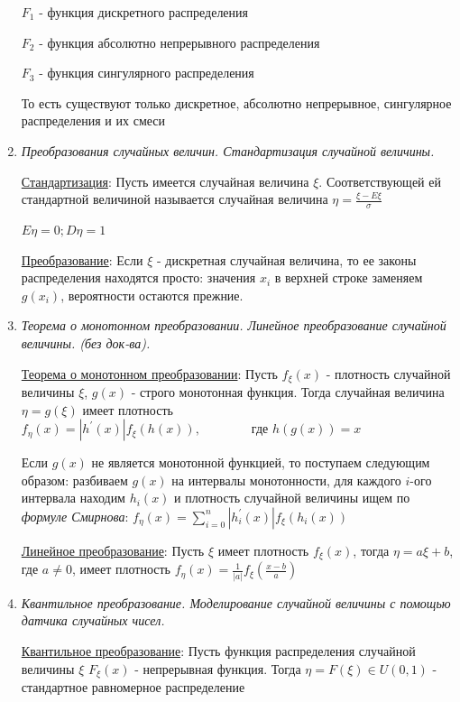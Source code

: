 \documentclass[12pt]{article}
\begin{document}
\begin{enumerate}
    $F_1$ - функция дискретного распределения

    $F_2$ - функция абсолютно непрерывного распределения

    $F_3$ - функция сингулярного распределения

    То есть существуют только дискретное, абсолютно непрерывное, сингулярное распределения и их смеси

    \item \textit{Преобразования случайных величин. Стандартизация случайной величины. }

    \hyperlink{standardizationofrandomvalue}{Стандартизация}: Пусть имеется случайная величина $\xi$. Соответствующей ей стандартной величиной называется
    случайная величина $\eta = \frac{\xi - E\xi}{\sigma}$

    $E\eta = 0; D\eta = 1$

    \hyperlink{randomvaluetransformation}{Преобразование}: Если $\xi$ - дискретная случайная величина, то ее законы распределения находятся просто: значения $x_i$ в верхней строке заменяем $g(x_i)$, вероятности остаются прежние.
    
    \item \textit{Теорема о монотонном преобразовании. Линейное преобразование случайной величины. (без док-ва).}
    
    \hyperlink{monotonoustransformationtheorem}{Теорема о монотонном преобразовании}: \Ths Пусть $f_\xi(x)$ - плотность случайной величины $\xi$, $g(x)$ - строго монотонная функция. Тогда 
    случайная величина $\eta = g(\xi)$ имеет плотность $f_\eta(x) = |h^\prime(x)| f_\xi(h(x)), \qquad\qquad \text{где } h(g(x)) = x$

    Если $g(x)$ не является монотонной функцией, то поступаем следующим образом: разбиваем $g(x)$ на интервалы монотонности, 
    для каждого $i$-ого интервала находим $h_i(x)$ и плотность случайной величины ищем по \textit{формуле Смирнова}: 
    $f_\eta(x) = \sum_{i = 0}^n |h_i^\prime(x)| f_\xi(h_i(x))$
    
    \hyperlink{lineartransformation}{Линейное преобразование}: \Ths Пусть $\xi$ имеет плотность $f_\xi(x)$, тогда $\eta = a\xi + b$, где $a \neq 0$, имеет плотность $f_\eta(x) = \frac{1}{|a|}f_\xi\left(\frac{x - b}{a}\right)$
    
    \item \textit{Квантильное преобразование. Моделирование случайной величины с помощью датчика случайных чисел.}

    \hyperlink{quantiletransformation}{Квантильное преобразование}: Пусть функция распределения случайной величины $\xi$ $F_\xi(x)$ - непрерывная функция. 
    Тогда $\eta = F(\xi) \in U(0, 1)$ - стандартное равномерное распределение


\end{enumerate}
\end{document}
